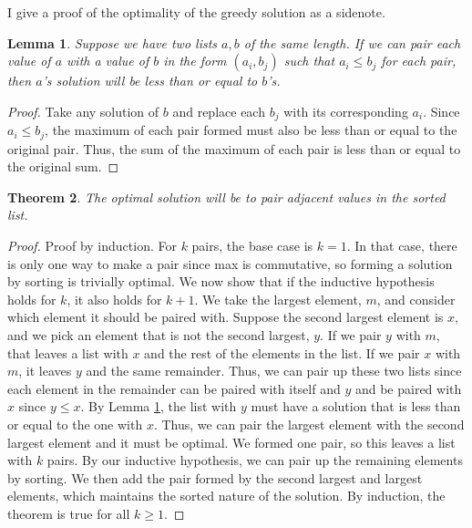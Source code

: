 \documentclass[11pt, oneside]{article}
\theoremstyle{plain}
\newtheorem{theorem}{Theorem}[section]
\newtheorem{lemma}[theorem]{Lemma}
\theoremstyle{definition}
\begin{document}
I give a proof of the optimality of the greedy solution as a sidenote.
\begin{lemma}
\label{lem:bijection}
  Suppose we have two lists \( a, b \) of the same length. 
  If we can pair each value of \( a \) with a value of \( b \)
  in the form \( (a_i, b_j) \) such that \( a_i \leq  b_j \) for each pair,
  then \( a \)'s solution will be less than or equal to \( b \)'s.
\end{lemma}
\begin{proof}
  Take any solution of \( b \) and replace each \( b_j \) with its corresponding
  \( a_i \). Since \( a_i \leq b_j \), the maximum of each pair formed must
  also be less than or equal to the original pair. Thus, the sum of the maximum
  of each pair is less than or equal to the original sum.
\end{proof}
\begin{theorem}
  The optimal solution will be to pair adjacent values in the sorted list.
\end{theorem}
\begin{proof}
  Proof by induction. For \( k \) pairs, the base case is \( k = 1 \).
  In that case, there is only one way to make a pair since max is commutative,
  so forming a solution by sorting is trivially optimal. 
  We now show that if the inductive hypothesis holds for \( k \), it also holds
  for \( k + 1 \). We take the largest element, \( m \),
  and consider which element it should be paired with.
  Suppose the second largest element is \( x \),
  and we pick an element that is not the second largest, \( y \).
  If we pair \( y \) with \( m \), that leaves a list with \( x \) and the rest
  of the elements in the list. If we pair \( x \) with \( m \), it leaves
  \( y \) and the same remainder. Thus, we can pair up these two lists
  since each element in the remainder can be paired with itself and 
  \( y \) and be paired with \( x \) since \( y \leq x \).
  By Lemma \ref{lem:bijection}, the list with \( y \) must have a solution that
  is less than or equal to the one with \( x \). Thus, we can pair the largest
  element with the second largest element and it must be optimal.
  We formed one pair, so this leaves a list with \( k \) pairs.
  By our inductive hypothesis, we can pair up the remaining elements by sorting.
  We then add the pair formed by the second largest and largest elements,
  which maintains the sorted nature of the solution.
  By induction, the theorem is true for all \( k \geq 1 \).
\end{proof}
\end{document}
